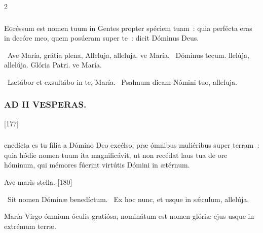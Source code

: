 \documentclass[9pt,twoside]{extarticle}
\begin{document}
\begin{multicols}{2}
\subsubsection*{}
\lettrine{E}gréssum est nomen tuum in Gentes propter spéciem tuam~: quia perfécta eras in decóre meo, quem posúeram super te~: dicit Dóminus Deus.

\begin{tightlist}{}
\item {}~Ave María, grátia plena, \textred{*} Alleluja, alleluja. ve María. ~Dóminus tecum. llelúja, allelúja. Glória Patri. ve María.
\item {}~Lætábor et exsultábo in te, María. ~Psalmum dicam Nómini tuo, alleluja.
\end{tightlist}

\subsubsection*{\center \textsc{AD II VESPERAS.}}
\begin{tightlist}{}
\item {}
\item {} [177]
\end{tightlist}

\subsubsection*{}
enedícta es tu fília a Dómino Deo excélso, præ ómnibus muliéribus super terram~: quia hódie nomen tuum ita magnificávit, ut non recédat laus tua de ore hóminum, qui mémores fúerint virtútis Dómini in ætérnum.

\begin{tightlist}{}
\item {} Ave maris stella. [180]
\item {}~Sit nomen Dóminæ benedíctum. ~Ex hoc nunc, et usque in sǽculum, allelúja.
\item {} María Virgo ómnium óculis gratiósa, nominátum est nomen glóriæ ejus usque in extrémum terræ.
\end{tightlist}


\end{multicols}
\end{document}
